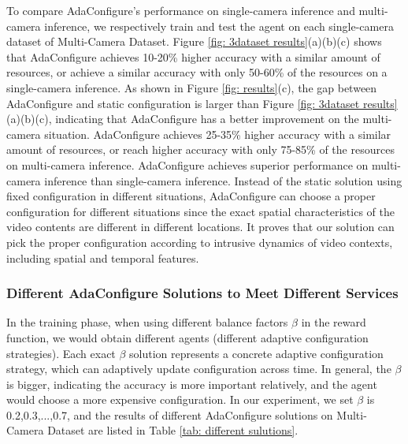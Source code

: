 To compare AdaConfigure's performance on single-camera inference and multi-camera inference, we respectively train and test the agent on each single-camera dataset of Multi-Camera Dataset. Figure \ref{fig: 3dataset results}(a)(b)(c) shows that AdaConfigure achieves 10-20\% higher accuracy with a similar amount of resources, or achieve a similar accuracy with only 50-60\% of the resources on a single-camera inference.  As shown in Figure \ref{fig: results}(c), the gap between AdaConfigure and static configuration is larger than Figure \ref{fig: 3dataset results}(a)(b)(c), indicating that AdaConfigure has a better improvement on the multi-camera situation. AdaConfigure achieves 25-35\% higher accuracy with a similar amount of resources, or reach higher accuracy with only 75-85\% of the resources on multi-camera inference. AdaConfigure achieves superior performance on multi-camera inference than single-camera inference. Instead of the static solution using fixed configuration in different situations, AdaConfigure can choose a proper configuration for different situations since the exact spatial characteristics of the video contents are different in different locations. It proves that our solution can pick the proper configuration according to intrusive dynamics of video contexts, including spatial and temporal features.

\subsubsection{Different AdaConfigure Solutions to Meet Different Services}
\label{subsec: different sulutions}
In the training phase, when using different balance factors $\beta$ in the reward function, we would obtain different agents (different adaptive configuration strategies). Each exact $\beta$ solution represents a concrete adaptive configuration strategy, which can adaptively update configuration across time. In general, the $\beta$ is bigger, indicating the accuracy is more important relatively, and the agent would choose a more expensive configuration. In our experiment, we set $\beta$ is 0.2,0.3,...,0.7, and the results of different AdaConfigure solutions on Multi-Camera Dataset are listed in Table \ref{tab: different sulutions}. 

